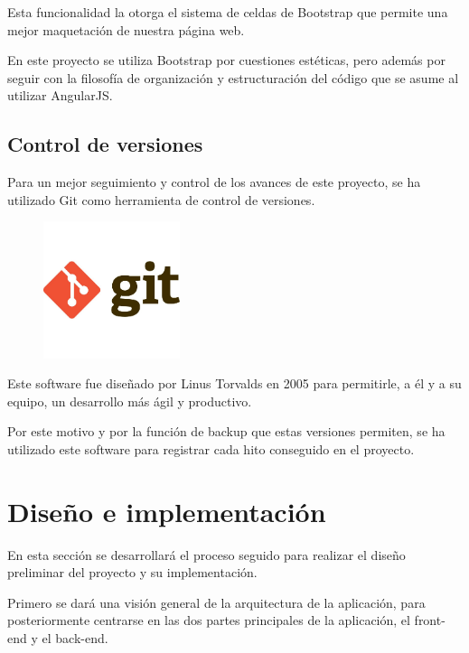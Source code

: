 \documentclass[a4paper, spanish, 12pt]{book}
\begin{document}
Esta funcionalidad la otorga el sistema de celdas de Bootstrap que permite una
mejor maquetaci\'on de nuestra p\'agina web.

En este proyecto se utiliza Bootstrap por cuestiones est\'eticas, pero adem\'as por
seguir con la filosof\'ia de organizaci\'on y estructuraci\'on del c\'odigo que se
asume al utilizar AngularJS.

\section{Control de versiones}
\label{sec:git}

Para un mejor seguimiento y control de los avances de este proyecto, se ha
utilizado Git como herramienta de control de versiones.

\begin{figure}[H]
  \centering
  \includegraphics[width=4cm, keepaspectratio]{img/git-logo}
\end{figure}

Este software fue dise\~nado por Linus Torvalds en 2005 para permitirle, a \'el
y a su equipo, un desarrollo m\'as \'agil y productivo.

Por este motivo y por la funci\'on de backup que estas versiones permiten,
se ha utilizado este software para registrar cada hito conseguido en el proyecto.


\cleardoublepage
\chapter{Dise\~no e implementaci\'on}

En esta secci\'on se desarrollar\'a el proceso seguido para realizar el dise\~no
preliminar del proyecto y su implementaci\'on.

Primero se dar\'a una visi\'on general de la arquitectura de la aplicaci\'on, para
posteriormente centrarse en las dos partes principales de la aplicaci\'on, el front-end
y el back-end.
\end{document}
